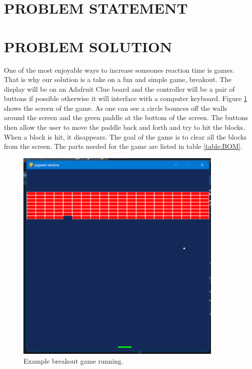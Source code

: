 \documentclass[12pt]{article}
\begin{document}
\section{PROBLEM STATEMENT}




\section{PROBLEM SOLUTION}
One of the most enjoyable ways to increase someones reaction time is games. That is why our solution is a take on a fun and simple game, breakout. The display will be on an Adafruit Clue board and the controller will be a pair of buttons if possible otherwise it will interface with a computer keyboard. Figure \ref{fig:Breakout_Screen} shows the screen of the game. As one can see a circle bounces off the walls around the screen and the green paddle at the bottom of the screen. The buttons then allow the user to move the paddle back and forth and try to hit the blocks. When a block is hit, it disappears. The goal of the game is to clear all the blocks from the screen. The parts needed for the game are listed in table \ref{table:BOM}.

\begin{figure}[ht]
\centering
\includegraphics[width=4in]{images/Breakout_Screen.png}
\caption{Example breakout game running.}
\label{fig:Breakout_Screen}
\end{figure}
\end{document}
